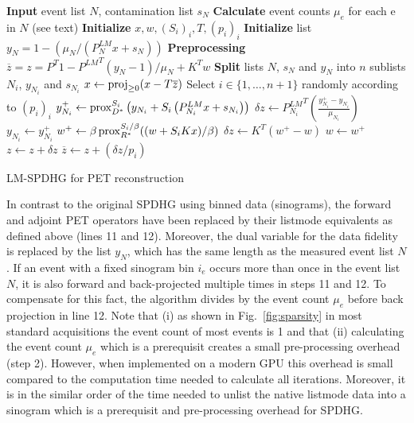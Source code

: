 \begin{algorithm}[t]
\begin{algorithmic}[1]
\small
\State \textbf{Input} event list $N$, contamination list $s_N$
\State \textbf{Calculate} event counts $\mu_e$ for each e in $N$ (see text)
\State \textbf{Initialize} $x,w,(S_i)_i,T,(p_i)_i$
\State \textbf{Initialize} list $y_{N} = 1 - (\mu_N /(P^{LM}_{N} x + s_{N}))$ 
\State \textbf{Preprocessing} $\overline{z} = z = {P^T} 1 - {P^{LM}}^T (y_N-1)/\mu_N + K^T w$ %
\State \textbf{Split} lists $N$, $s_N$ and $y_N$ into $n$ sublists $N_i$, $y_{N_i}$ and $s_{N_i}$
\Repeat
	\State $x \gets \operatorname{proj}_{\geq 0} (x - T \overline{z})$
	\State Select $i \in \{1,\ldots,n+1\}$ randomly according to $(p_i)_i$
	  \State $y_{N_i}^+ \gets \operatorname{prox}_{D^*}^{S_i} \left( y_{N_i} + S_i \left(P^{LM}_{N_i} x + s_{N_i} \right) \right)$
	  \State $\delta z \gets {P^{LM}_{N_i}}^T \left(\frac{y_{N_i}^+ - y_{N_i}}{\mu_{N_i}}\right)$
	  \State $y_{N_i} \gets y_{N_i}^+$
  \Else
	  \State $w^+ \gets \beta \operatorname{prox}_{R^*}^{S_i/\beta} ((w + S_i  K x)/\beta)$
	  \State $\delta z \gets K^T \left(w^+ - w\right)$
	  \State $w \gets w^+$
  \EndIf
	\State $z \gets z + \delta z$
	\State $\overline{z} \gets  z + (\delta z/p_i)$
\State {}
\end{algorithmic}
\caption{LM-SPDHG for PET reconstruction}
\label{alg:lmspdhg}
\end{algorithm}


In contrast to the original SPDHG using binned data (sinograms), the forward and adjoint
PET operators have been replaced by their listmode equivalents as defined above (lines 11 and 12).
Moreover, the dual variable for the data fidelity is replaced by the list $y_N$, which has the
same length as the measured event list $N$.
If an event with a fixed sinogram bin $i_e$ occurs more than once in the event list
$N$, it is also forward and back-projected multiple times in steps 11 and 12.
To compensate for this fact, the algorithm divides by the event count $\mu_e$ before back projection
in line 12.
Note that (i) as shown in Fig.~\ref{fig:sparsity} in most standard acquisitions the event count
of most events is 1 and that (ii) calculating the event count $\mu_e$ which is a prerequisit
creates a small pre-processing overhead (step 2).
However, when implemented on a modern GPU this overhead is small compared to the computation
time needed to calculate all iterations.
Moreover, it is in the similar order of the time needed to unlist the native listmode data into
a sinogram which is a prerequisit and pre-processing overhead for SPDHG.

